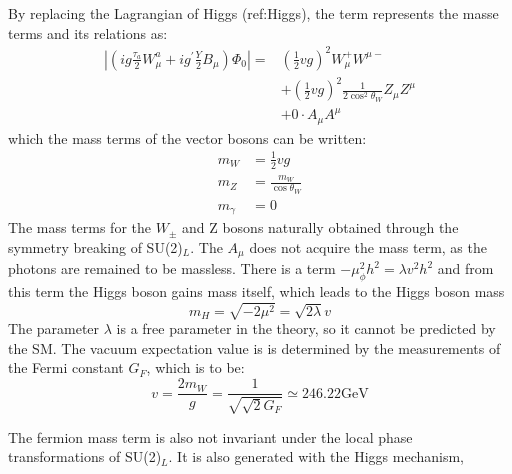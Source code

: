 By replacing the Lagrangian of Higgs (ref{\eqn:Higgs}), the term represents the masse terms and its relations as:
\begin{equation}
\begin{aligned}
\left|\left(i g \frac{\tau_{a}}{2} W_{\mu}^{a}+i g^{\prime} \frac{Y}{2} B_{\mu}\right) \Phi_{0}\right|=&\left(\frac{1}{2} v g\right)^{2} W_{\mu}^{+} W^{\mu-} \\
&+\left(\frac{1}{2} v g\right)^{2} \frac{1}{2 \cos ^{2} \theta_{W}} Z_{\mu} Z^{\mu} \\
&+0 \cdot A_{\mu} A^{\mu}
\end{aligned}
\end{equation}
which the mass terms of the vector bosons can be written:
\begin{equation}
\begin{aligned}
m_{W}&=\frac{1}{2} vg \\
m_{Z}&=\frac{m_{W}}{\cos \theta_{W}} \\
m_{\gamma}&=0
\end{aligned}
\end{equation}
The mass terms for the $W_\pm$ and Z bosons naturally obtained through the symmetry breaking of SU(2)$_L$. 
The $A_\mu$ does not acquire the mass term, as the photons are remained to be massless.
There is a term $-\mu_{\phi}^{2} h^{2}=\lambda v^{2} h^{2}$ and from this term the Higgs boson gains mass itself, which leads to the Higgs boson mass 
\begin{equation}
m_{H}=\sqrt{-2 \mu^{2}}=\sqrt{2 \lambda} v
\end{equation}
The parameter $\lambda$ is a free parameter in the theory, so it cannot be predicted by the SM.
The vacuum expectation value is is determined by the measurements of the Fermi constant $G_F$, which is to be:
\begin{equation}
v=\frac{2 m_{W}}{g}=\frac{1}{\sqrt{\sqrt{2} G_{F}}} \simeq 246.22 \mathrm{GeV}
\end{equation}

The fermion mass term is also not invariant under the local phase transformations of SU(2)$_L$. It is also generated with the Higgs mechanism,


